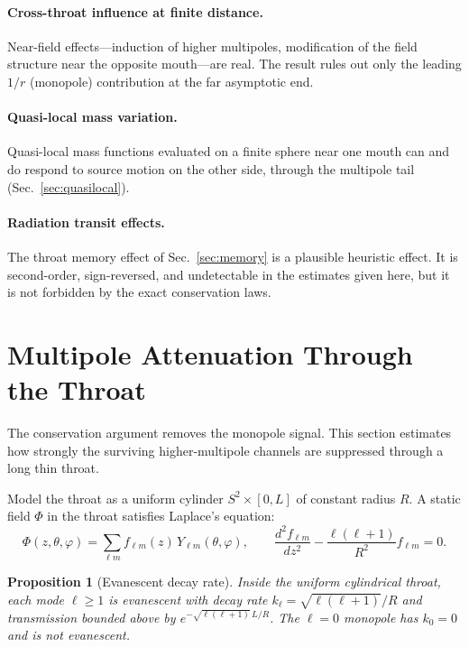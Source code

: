 \documentclass[aps,prd,onecolumn,nofootinbib,superscriptaddress]{revtex4-2}
\newtheorem{proposition}{Proposition}
\begin{document}
\paragraph{Cross-throat influence at finite distance.}
Near-field effects---induction of higher multipoles, modification of the field
structure near the opposite mouth---are real.  The result rules out only the
leading $1/r$ (monopole) contribution at the far asymptotic end.

\paragraph{Quasi-local mass variation.}
Quasi-local mass functions evaluated on a finite sphere near one mouth can and
do respond to source motion on the other side, through the multipole tail
(Sec.~\ref{sec:quasilocal}).

\paragraph{Radiation transit effects.}
The throat memory effect of Sec.~\ref{sec:memory} is a plausible heuristic
effect.  It is second-order, sign-reversed, and undetectable in the estimates
given here, but it is not forbidden by the exact conservation laws.

\section{Multipole Attenuation Through the Throat}
\label{sec:attenuation}

The conservation argument removes the monopole signal.  This section estimates
how strongly the surviving higher-multipole channels are suppressed through a
long thin throat.

Model the throat as a uniform cylinder $S^2\times[0,L]$ of constant radius
$R$.  A static field $\Phi$ in the throat satisfies Laplace's equation:
\begin{equation}
  \Phi(z,\theta,\varphi)
  = \sum_{\ell m}f_{\ell m}(z)\,Y_{\ell m}(\theta,\varphi),
  \qquad
  \frac{d^2 f_{\ell m}}{dz^2} - \frac{\ell(\ell+1)}{R^2}f_{\ell m}=0.
\end{equation}

\begin{proposition}[Evanescent decay rate]
\label{prop:attenuation}
Inside the uniform cylindrical throat, each mode $\ell\ge 1$ is evanescent
with decay rate $k_\ell=\sqrt{\ell(\ell+1)}/R$ and transmission bounded above
by $e^{-\sqrt{\ell(\ell+1)}\,L/R}$.  The $\ell=0$ monopole has $k_0=0$ and
is not evanescent.
\end{proposition}
\end{document}
